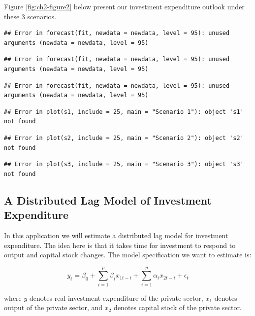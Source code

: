 \documentclass[]{book}
\theoremstyle{definition}
\theoremstyle{definition}
\theoremstyle{definition}
\theoremstyle{remark}
\begin{document}
Figure \ref{fig:ch2-figure2} below present our investment expenditure
outlook under these 3 scenarios.

\begin{verbatim}
## Error in forecast(fit, newdata = newdata, level = 95): unused arguments (newdata = newdata, level = 95)
\end{verbatim}

\begin{verbatim}
## Error in forecast(fit, newdata = newdata, level = 95): unused arguments (newdata = newdata, level = 95)
\end{verbatim}

\begin{verbatim}
## Error in forecast(fit, newdata = newdata, level = 95): unused arguments (newdata = newdata, level = 95)
\end{verbatim}

\begin{verbatim}
## Error in plot(s1, include = 25, main = "Scenario 1"): object 's1' not found
\end{verbatim}

\begin{verbatim}
## Error in plot(s2, include = 25, main = "Scenario 2"): object 's2' not found
\end{verbatim}

\begin{verbatim}
## Error in plot(s3, include = 25, main = "Scenario 3"): object 's3' not found
\end{verbatim}

\hypertarget{a-distributed-lag-model-of-investment-expenditure}{%
\subsection{A Distributed Lag Model of Investment
Expenditure}\label{a-distributed-lag-model-of-investment-expenditure}}

In this application we will estimate a distributed lag model for
investment expenditure. The idea here is that it takes time for
investment to respond to output and capital stock changes. The model
specification we want to estimate is:

\begin{equation}
y_t= \beta_0 + \sum_{i=1}^p\beta_i x_{1t-i}+\sum_{i=1}^p\alpha_i x_{2t-i}+\epsilon_t
\end{equation}

where \(y\) denotes real investment expenditure of the private sector,
\(x_1\) denotes output of the private sector, and \(x_2\) denotes
capital stock of the private sector.
\end{document}
